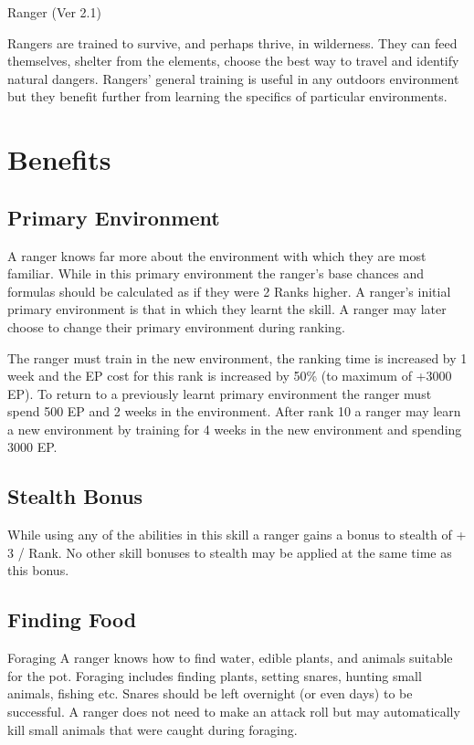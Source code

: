 \begin{Chapter}{Ranger (Ver 2.1)}

Rangers are trained to survive, and perhaps thrive, in wilderness.
They can feed themselves, shelter from the elements, choose the best
way to travel and identify natural dangers.  Rangers’ general training
is useful in any outdoors environment but they benefit further from
learning the specifics of particular environments.

\section{Benefits}

\subsection{Primary Environment}

A ranger knows far more about the environment with which they are most
familiar.  While in this primary environment the ranger’s base chances
and formulas should be calculated as if they were 2 Ranks higher.  A
ranger’s initial primary environment is that in which they learnt
the skill.  A ranger may later choose to change their primary
environment during ranking.

The ranger must train in the new environment, the ranking time is
increased by 1 week and the EP cost for this rank is increased by 50\%
(to maximum of +3000 EP).  To return to a previously learnt primary
environment the ranger must spend 500 EP and 2 weeks in the
environment.  After rank 10 a ranger may learn a new environment by
training for 4 weeks in the new environment and spending 3000 EP.

\subsection{Stealth Bonus}

While using any of the abilities in this skill a ranger gains a bonus
to stealth of + 3 / Rank.  No other skill bonuses to stealth may be
applied at the same time as this bonus.

\subsection{Finding Food}

\begin{Description}
\item[Foraging] A ranger knows how to find water, edible plants, and
  animals suitable for the pot. Foraging includes finding plants,
  setting snares, hunting small animals, fishing etc.  Snares should
  be left overnight (or even days) to be successful. A ranger does not
  need to make an attack roll but may automatically kill small
  animals that were caught during foraging.


\end{Description}
\end{Chapter}
